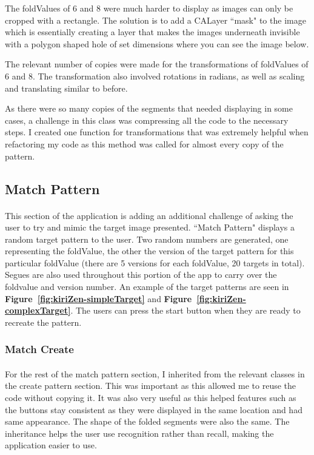 \documentclass[11pt]{article}
\begin{document}
            The foldValues of 6 and 8 were much harder to display as images can only be cropped with a rectangle. The solution is to add a CALayer ``mask" to the image which is essentially creating a layer that makes the images underneath invisible with a polygon shaped hole of set dimensions where you can see the image below.
            
            The relevant number of copies were made for the transformations of foldValues of 6 and 8. The transformation also involved rotations in radians, as well as scaling and translating similar to before.
                    
            As there were so many copies of the segments that needed displaying in some cases, a challenge in this class was compressing all the code to the necessary steps. I created one function for transformations that was extremely helpful when refactoring my code as this method was called for almost every copy of the pattern. 
            

    \subsection{Match Pattern}
            \paragraph{}
            This section of the application is adding an additional challenge of asking the user to try and mimic the target image presented. ``Match Pattern" displays a random target pattern to the user. Two random numbers are generated, one representing the foldValue, the other the version of the target pattern for this particular foldValue (there are 5 versions for each foldValue, 20 targets in total). Segues are also used throughout this portion of the app to carry over the foldvalue and version number. An example of the target patterns are seen in \textbf{Figure~\ref{fig:kiriZen-simpleTarget}} and \textbf{Figure~\ref{fig:kiriZen-complexTarget}}. The users can press the start button when they are ready to recreate the pattern.
                    
        \subsubsection{Match Create}
            \paragraph{}
            For the rest of the match pattern section, I inherited from the relevant classes in the create pattern section. This was important as this allowed me to reuse the code without copying it. It was also very useful as this helped features such as the buttons stay consistent as they were displayed in the same location and had same appearance. The shape of the folded segments were also the same. The inheritance helps the user use recognition rather than recall, making the application easier to use. 
\end{document}
